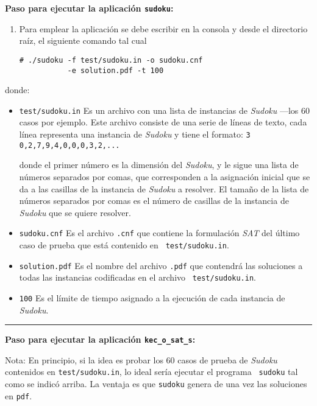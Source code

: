 \documentclass[12pt,lettersize,oneside]{article}
\begin{document}
\textbf{Paso para ejecutar la aplicación {\tt sudoku}:}
\begin{enumerate}
\item Para emplear la aplicación se debe escribir en la consola y desde el directorio
raíz, el siguiente comando tal cual

\begin{lstlisting}[style=consola]
# ./sudoku -f test/sudoku.in -o sudoku.cnf 
           -e solution.pdf -t 100
\end{lstlisting}
\end{enumerate}
donde:
\begin{itemize}
\item {\tt test/sudoku.in} Es un archivo con una lista de instancias de
  \emph{Sudoku} ---los 60 casos por ejemplo. Este archivo consiste de una serie
  de líneas de texto, cada línea representa una instancia de \emph{Sudoku} y
  tiene el formato: 
  {\tt 3 0,2,7,9,4,0,0,0,3,2,...}
  
  donde el primer número es la dimensión del \emph{Sudoku}, y le sigue una lista
  de números separados por comas, que corresponden a la asignación inicial que
  se da a las casillas de la instancia de \emph{Sudoku} a resolver. El tamaño de
  la lista de números separados por comas es el número de casillas de la
  instancia de \emph{Sudoku} que se quiere resolver.

\item {\tt sudoku.cnf} Es el archivo {\tt .cnf} que contiene la formulación
  \emph{SAT} del último caso de prueba que está contenido en {\tt
    test/sudoku.in}.
\item {\tt solution.pdf} Es el nombre del archivo {\tt .pdf} que contendrá las
  soluciones a todas las instancias codificadas en el archivo {\tt
    test/sudoku.in}.
\item{\tt 100} Es el límite de tiempo asignado a la ejecución de cada instancia
  de \emph{Sudoku}.
\end{itemize}

\rule{4cm}{0.3mm}

\textbf{Paso para ejecutar la aplicación {\tt kec\_o\_sat\_s}:}

Nota: En principio, si la idea es probar los 60 casos de prueba de \emph{Sudoku}
contenidos en {\tt test/sudoku.in}, lo ideal sería ejecutar el programa {\tt
  sudoku} tal como se indicó arriba. La ventaja es que {\tt sudoku} genera de
una vez las soluciones en {\tt pdf}.
\end{document}
